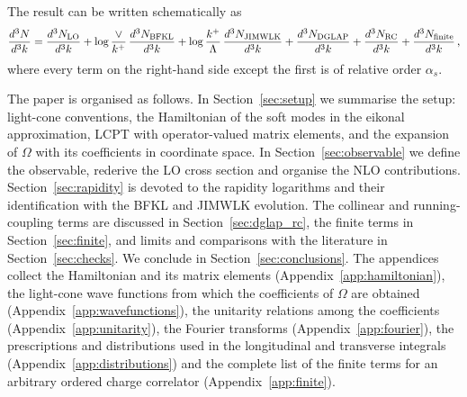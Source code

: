 The result can be written schematically as
\begin{align}\label{eq:schematic}
\frac{d^3N}{d^3k} = \frac{d^3N_{\rm LO}}{d^3k}
+ \log\frac{\vee}{k^+}\,\frac{d^3N_{\rm BFKL}}{d^3k}
+ \log\frac{k^+}{\Lambda}\,\frac{d^3N_{\rm JIMWLK}}{d^3k}
+ \frac{d^3N_{\rm DGLAP}}{d^3k}
+ \frac{d^3N_{\rm RC}}{d^3k}
+ \frac{d^3N_{\rm finite}}{d^3k}\,,
\end{align}
where every term on the right-hand side except the first is of relative order $\alpha_s$.

The paper is organised as follows. In Section~\ref{sec:setup} we summarise the setup: light-cone conventions, the Hamiltonian of the soft modes in the eikonal approximation, LCPT with operator-valued matrix elements, and the expansion of $\Omega$ with its coefficients in coordinate space. In Section~\ref{sec:observable} we define the observable, rederive the LO cross section and organise the NLO contributions. Section~\ref{sec:rapidity} is devoted to the rapidity logarithms and their identification with the BFKL and JIMWLK evolution. The collinear and running-coupling terms are discussed in Section~\ref{sec:dglap_rc}, the finite terms in Section~\ref{sec:finite}, and limits and comparisons with the literature in Section~\ref{sec:checks}. We conclude in Section~\ref{sec:conclusions}. The appendices collect the Hamiltonian and its matrix elements (Appendix~\ref{app:hamiltonian}), the light-cone wave functions from which the coefficients of $\Omega$ are obtained (Appendix~\ref{app:wavefunctions}), the unitarity relations among the coefficients (Appendix~\ref{app:unitarity}), the Fourier transforms (Appendix~\ref{app:fourier}), the prescriptions and distributions used in the longitudinal and transverse integrals (Appendix~\ref{app:distributions}) and the complete list of the finite terms for an arbitrary ordered charge correlator (Appendix~\ref{app:finite}).
